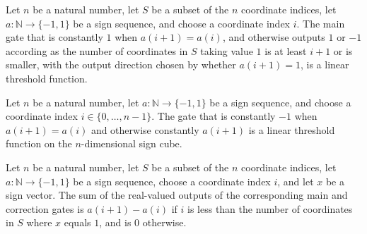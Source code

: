 \begin{theorem}
\label{FABL.profileMainGate_isLinearThreshold}
\leanok
{}
Let $n$ be a natural number, let $S$ be a subset of the $n$ coordinate indices, let
$a:\mathbb{N}\to\{−1,1\}$ be a sign sequence, and choose a coordinate index $i$. The
main gate that is constantly $1$ when $a(i+1)=a(i)$, and otherwise outputs $1$ or $-1$
according as the number of coordinates in $S$ taking value $1$ is at least $i+1$ or is
smaller, with the output direction chosen by whether $a(i+1)=1$, is a linear threshold
function.
\end{theorem}

\begin{theorem}
\label{FABL.profileCorrectionGate_isLinearThreshold}
\leanok
{}
Let $n$ be a natural number, let $a:\mathbb{N}\to\{−1,1\}$ be a sign sequence, and
choose a coordinate index $i\in\{0,\ldots,n-1\}$. The gate that is constantly $-1$ when
$a(i+1)=a(i)$ and otherwise constantly $a(i+1)$ is a linear threshold function on the
$n$-dimensional sign cube.
\end{theorem}

\begin{theorem}
\label{FABL.profileGate_pair_value}
\leanok
{}
Let $n$ be a natural number, let $S$ be a subset of the $n$ coordinate indices, let
$a:\mathbb{N}\to\{−1,1\}$ be a sign sequence, choose a coordinate index $i$, and let $x$
be a sign vector. The sum of the real-valued outputs of the corresponding main and
correction gates is $a(i+1)-a(i)$ if $i$ is less than the number of coordinates in $S$
where $x$ equals $1$, and is $0$ otherwise.
\end{theorem}

